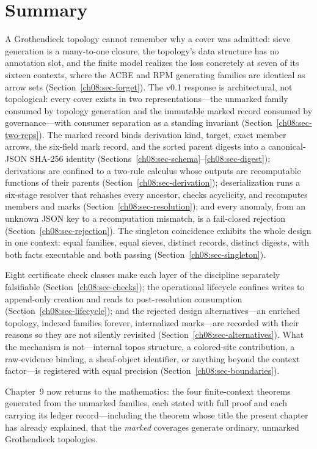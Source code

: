 \section{Summary}\label{ch08:sec-summary}

A Grothendieck topology cannot remember why a cover was admitted: sieve generation is a many-to-one closure, the topology's data structure has no annotation slot, and the finite model realizes the loss concretely at seven of its sixteen contexts, where the ACBE and RPM generating families are identical as arrow sets (Section~\ref{ch08:sec-forget}). The v0.1 response is architectural, not topological: every cover exists in two representations---the unmarked family consumed by topology generation and the immutable marked record consumed by governance---with consumer separation as a standing invariant (Section~\ref{ch08:sec-two-reps}). The marked record binds derivation kind, target, exact member arrows, the six-field mark record, and the sorted parent digests into a canonical-JSON SHA-256 identity (Sections~\ref{ch08:sec-schema}--\ref{ch08:sec-digest}); derivations are confined to a two-rule calculus whose outputs are recomputable functions of their parents (Section~\ref{ch08:sec-derivation}); deserialization runs a six-stage resolver that rehashes every ancestor, checks acyclicity, and recomputes members and marks (Section~\ref{ch08:sec-resolution}); and every anomaly, from an unknown JSON key to a recomputation mismatch, is a fail-closed rejection (Section~\ref{ch08:sec-rejection}). The singleton coincidence exhibits the whole design in one context: equal families, equal sieves, distinct records, distinct digests, with both facts executable and both passing (Section~\ref{ch08:sec-singleton}).

Eight certificate check classes make each layer of the discipline separately falsifiable (Section~\ref{ch08:sec-checks}); the operational lifecycle confines writes to append-only creation and reads to post-resolution consumption (Section~\ref{ch08:sec-lifecycle}); and the rejected design alternatives---an enriched topology, indexed families forever, internalized marks---are recorded with their reasons so they are not silently revisited (Section~\ref{ch08:sec-alternatives}). What the mechanism is not---internal topos structure, a colored-site contribution, a raw-evidence binding, a sheaf-object identifier, or anything beyond the context factor---is registered with equal precision (Section~\ref{ch08:sec-boundaries}).

Chapter~9 now returns to the mathematics: the four finite-context theorems generated from the unmarked families, each stated with full proof and each carrying its ledger record---including the theorem whose title the present chapter has already explained, that the \emph{marked} coverages generate ordinary, unmarked Grothendieck topologies.
